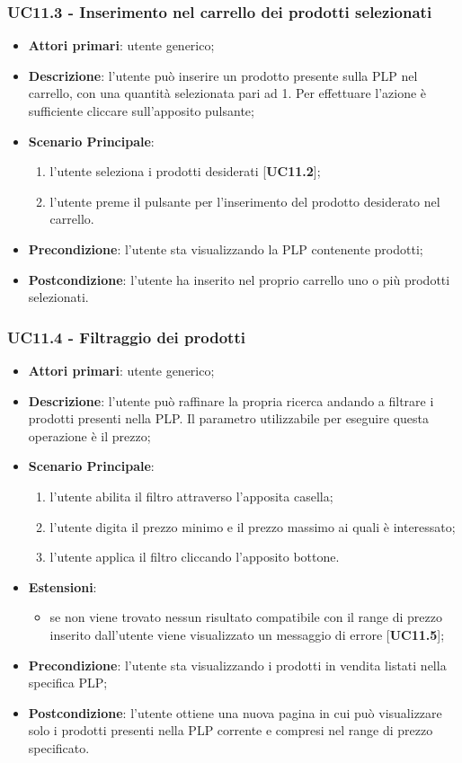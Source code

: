 \subsubsection{UC11.3 - Inserimento nel carrello dei prodotti selezionati}
\begin{itemize}
\item \textbf{Attori primari}: utente generico;
\item \textbf{Descrizione}: l'utente può inserire un prodotto presente sulla PLP nel carrello, con una quantità selezionata pari ad 1. Per effettuare l'azione è sufficiente cliccare sull'apposito pulsante;
\item \textbf{Scenario Principale}:
\begin{enumerate}
\item l'utente seleziona i prodotti desiderati [\textbf{UC11.2}];
\item l'utente preme il pulsante per l'inserimento del prodotto desiderato nel carrello.
\end{enumerate}
\item \textbf{Precondizione}: l'utente sta visualizzando la PLP contenente prodotti;
\item \textbf{Postcondizione}: l'utente ha inserito nel proprio carrello uno o più prodotti selezionati.
\end{itemize}
\subsubsection{UC11.4 - Filtraggio dei prodotti}
\begin{itemize}
\item \textbf{Attori primari}: utente generico;
\item \textbf{Descrizione}: l'utente può raffinare la propria ricerca andando a filtrare i prodotti presenti nella PLP. Il parametro utilizzabile per eseguire questa operazione è il prezzo;
\item \textbf{Scenario Principale}:
\begin{enumerate}
\item l'utente abilita il filtro attraverso l'apposita casella;
\item l'utente digita il prezzo minimo e il prezzo massimo ai quali è interessato;
\item l'utente applica il filtro cliccando l'apposito bottone.
\end{enumerate}
\item \textbf{Estensioni}:
\begin{itemize}
\item se non viene trovato nessun risultato compatibile con il range di prezzo inserito dall'utente viene visualizzato un messaggio di errore [\textbf{UC11.5}];
\end{itemize}
\item \textbf{Precondizione}: l'utente sta visualizzando i prodotti in vendita listati nella specifica PLP;
\item \textbf{Postcondizione}: l'utente ottiene una nuova pagina in cui può visualizzare solo i prodotti presenti nella PLP corrente e compresi nel range di prezzo specificato.
\end{itemize}
